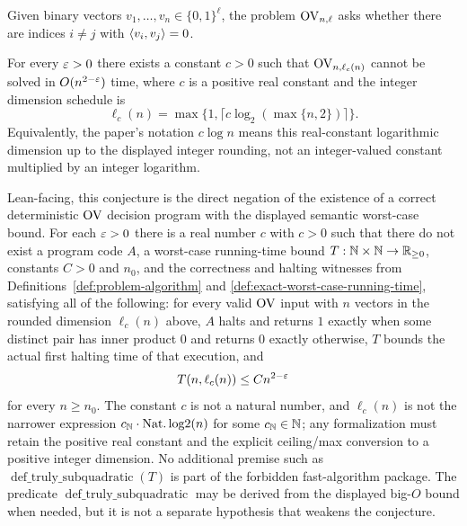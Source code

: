 \begin{definition}
  \label{def:ov}
  Given binary vectors $v_1,\ldots,v_n\in\{0,1\}^{\ell}$, the problem
  $\mathrm{OV}_{n,\ell}$ asks whether there are indices $i\neq j$ with
  $\left\langle v_i,v_j\right\rangle=0$.
\end{definition}

\begin{conjecture}
  \label{conj:ovc}
  For every $\varepsilon>0$ there exists a constant $c>0$ such that
  $\mathrm{OV}_{n,\ell_c(n)}$ cannot be solved in $O(n^{2-\varepsilon})$ time, where $c$ is a
  positive real constant and the integer dimension schedule is
  \[
    \ell_c(n)=\max\{1,\lceil c\log_2(\max\{n,2\})\rceil\}.
  \]
  Equivalently, the paper's notation $c\log n$ means this real-constant
  logarithmic dimension up to the displayed integer rounding, not an
  integer-valued constant multiplied by an integer logarithm.

  Lean-facing, this conjecture is the direct negation of the existence of a
  correct deterministic $\mathrm{OV}$ decision program with the displayed semantic
  worst-case bound.  For each $\varepsilon>0$ there is a real number $c$ with
  $c>0$ such that there do not exist a program code $A$, a worst-case
  running-time bound
  $T:\mathbb{N}\times\mathbb{N}\to\mathbb{R}_{\geq0}$, constants $C>0$ and $n_0$, and the correctness
  and halting witnesses from Definitions~\ref{def:problem-algorithm} and
  \ref{def:exact-worst-case-running-time}, satisfying all of the following:
  for every valid $\mathrm{OV}$ input with $n$ vectors in the rounded dimension
  $\ell_c(n)$ above, $A$ halts and returns $1$ exactly when some distinct pair
  has inner product $0$ and returns $0$ exactly otherwise, $T$ bounds the
  actual first halting time of that execution, and
  \[
    T(n,\ell_c(n))\leq C n^{2-\varepsilon}
  \]
  for every $n\geq n_0$.  The constant $c$ is not a natural number, and
  $\ell_c(n)$ is not the narrower expression
  $c_{\mathbb{N}}\cdot\operatorname{Nat.log2}(n)$ for some
  $c_{\mathbb{N}}\in\mathbb{N}$; any formalization must retain the positive real constant and
  the explicit ceiling/max conversion to a positive integer dimension.
  No additional premise such as
  $\operatorname{def\_truly\_subquadratic}(T)$ is part of the forbidden
  fast-algorithm package.  The predicate
  $\operatorname{def\_truly\_subquadratic}$ may be derived from the displayed
  big-$O$ bound when needed, but it is not a separate hypothesis that weakens
  the conjecture.
\end{conjecture}

